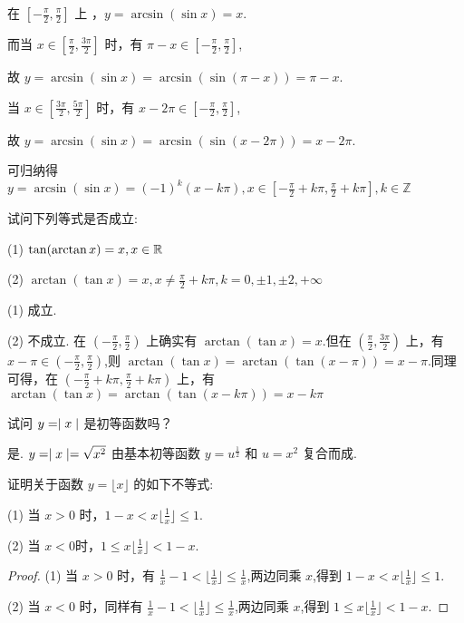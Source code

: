 \begin{solve}
    在 $[-\frac{\pi}{2},\frac{\pi}{2}]$ 上 ，$y=\arcsin(\sin x)=x$. 

    而当 $x\in [\frac{\pi}{2},\frac{3\pi}{2}]$ 时，有 $\pi-x \in [-\frac{\pi}{2},\frac{\pi}{2}]$,
    
    故 $y=\arcsin(\sin x)=\arcsin(\sin(\pi- x))=\pi-x$.

    当 $x\in [\frac{3\pi}{2},\frac{5\pi}{2}]$ 时，有 $x-2\pi \in [-\frac{\pi}{2},\frac{\pi}{2}]$,
    
    故 $y=\arcsin(\sin x)=\arcsin(\sin(x-2\pi))=x-2\pi$.

    可归纳得 $y=\arcsin(\sin x)=(-1)^k(x-k\pi),x\in [-\frac{\pi}{2}+k\pi,\frac{\pi}{2}+k\pi],k\in \mathbb{Z}$
\end{solve}

\begin{practice}
    试问下列等式是否成立:
    
    (1) $\tan (\arctan x)=x,x\in \mathbb{R}$
    
    (2) $\arctan (\tan x)=x,x\ne \frac{\pi}{2}+k\pi,k=0,\pm 1,\pm 2,+\infty$
\end{practice}

\begin{solve}
    (1) 成立.

    (2) 不成立. 在 $(-\frac{\pi}{2},\frac{\pi}{2})$ 上确实有 $\arctan(\tan x)=x$.但在 $(\frac{\pi}{2},\frac{3\pi}{2})$ 上，有 $x-\pi \in (-\frac{\pi}{2},\frac{\pi}{2})$,则 $\arctan(\tan x)=\arctan(\tan (x-\pi))=x-\pi$.同理可得，在 $(-\frac{\pi}{2}+k\pi,\frac{\pi}{2}+k\pi)$ 上，有 $\arctan(\tan x)=\arctan(\tan (x-k\pi))=x-k\pi$
\end{solve}

\begin{practice}
    试问 $y=\mid x \mid$ 是初等函数吗？
\end{practice}

\begin{solve}
    是. $y=\mid x \mid=\sqrt{x^2}$ 由基本初等函数 $y=u^{\frac{1}{2}}$ 和 $u=x^2$ 复合而成.
\end{solve}

\begin{practice}
    证明关于函数 $y=\lfloor x \rfloor$ 的如下不等式:

    (1) 当 $x>0$ 时，$1-x<x\lfloor \frac{1}{x} \rfloor \le 1$.

    (2) 当 $x<0$时，$1\le x\lfloor \frac{1}{x} \rfloor <1-x$.
\end{practice}

\begin{proof}
    (1) 当 $x>0$ 时，有 $ \frac{1}{x}  -1 < \lfloor \frac{1}{x} \rfloor\le \frac{1}{x}$,两边同乘 $x$,得到 $1-x<x\lfloor \frac{1}{x} \rfloor \le 1$.

   (2) 当 $x<0$ 时，同样有 $ \frac{1}{x}  -1 < \lfloor \frac{1}{x} \rfloor\le \frac{1}{x}$,两边同乘 $x$,得到 $1\le x\lfloor \frac{1}{x} \rfloor < 1-x$.
\end{proof}

\newsection